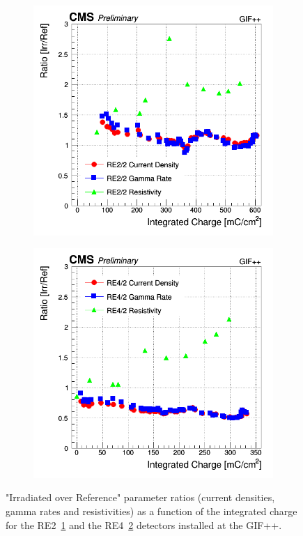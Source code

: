 	\begin{figure}[H]
    	\begin{subfigure}{0.5\linewidth}
    		\centering
			\includegraphics[width = \linewidth]{fig/chapt5/RE2-2-Source-Ratios-vs-Time-9600.png}
        	\caption{\label{fig:GIFpp-Ratios-mon:A}}
    	\end{subfigure}
    	\begin{subfigure}{0.5\linewidth}
			\centering
    		\includegraphics[width = \linewidth]{fig/chapt5/RE4-2-Source-Ratios-vs-Time-9500.png}
        	\caption{\label{fig:GIFpp-Ratios-mon:B}}
    	\end{subfigure}
		\caption{\label{fig:GIFpp-Ratios-mon} "Irradiated over Reference" parameter ratios (current densities, gamma rates and resistivities) as a function of the integrated charge for the RE2~\ref{fig:GIFpp-Ratios-mon:A} and the RE4~\ref{fig:GIFpp-Ratios-mon:B} detectors installed at the GIF++.}
	\end{figure}
	

